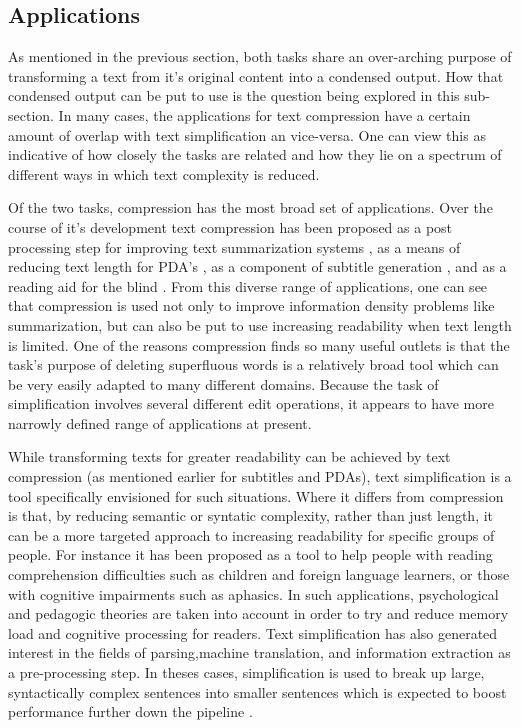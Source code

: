 {\subsection{Applications}


{As mentioned in the previous section, both tasks share an over-arching purpose of transforming a text from it's original content into a condensed output. How that condensed output can be put to use is the question being explored in this sub-section.  In many cases, the applications for text compression have a certain amount of overlap with text simplification an vice-versa. One can view this as indicative of how closely the tasks are related and how they  lie on a spectrum of different ways in which text complexity is reduced.}

{Of the two tasks, compression has the most broad set of applications.  Over the course of it's development text compression has been proposed as a post processing step for improving text summarization systems \citep{Jing:2000:SRA:974147.974190,Knight:2002:SBS:604203.604207} , as a means of reducing text length for PDA's \citep{corston2001text}, as a component of subtitle generation \citep{vandeghinste2004sentence}, and as a reading aid for the blind \citep{grefenstette1998producing}. From this diverse range of applications, one can see that compression is used not only to improve information density problems like summarization, but can also be put to  use increasing readability when text length is limited. One of the reasons compression finds so many useful outlets is that the task's purpose of deleting superfluous words is a relatively broad tool which can be very easily adapted to many different domains.  Because the task of simplification involves several different edit operations, it appears to have more narrowly defined range of applications at present.}


{While transforming texts for greater readability can be achieved by text compression (as mentioned earlier for subtitles and PDAs), text simplification is a tool specifically envisioned for such situations.  Where it differs from compression is that, by reducing semantic or syntatic complexity, rather than just length, it can be a more targeted approach to increasing readability for specific groups of people.  For instance it has been proposed as a tool to help people with reading comprehension difficulties such as children and foreign language learners, or those with cognitive impairments such as aphasics\citep{Feng2008}. In such applications, psychological and pedagogic theories are taken into account in order to try and reduce memory load and cognitive processing for readers.  Text simplification has also generated interest in the fields of parsing,machine translation, and information extraction as a pre-processing step. In theses cases, simplification is used to break up large, syntactically complex sentences into smaller sentences which is expected to boost performance   further down the pipeline \citep{jonnalagadda2010biosimplify,Siddharthan2006}.}


}
